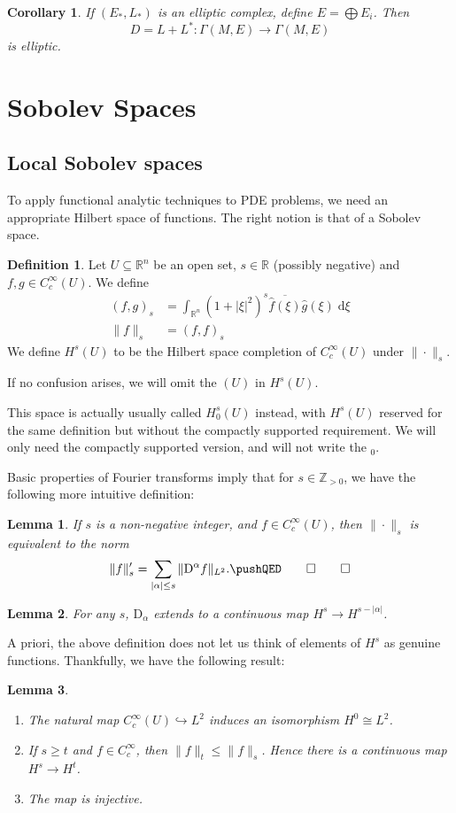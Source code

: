 \documentclass{shortart}
\newtheorem*{lemma}{Lemma}
\newtheorem*{cor}{Corollary}
\theoremstyle{definition}
\newtheorem*{defi}{Definition}
\newcommand\R{\mathbb{R}}
\newcommand\Z{\mathbb{Z}}
\renewcommand\d{\mathrm{d}}
\newcommand\D{\mathrm{D}}
\begin{document}
\begin{cor}
  If $(E_*, L_*)$ is an elliptic complex, define $E = \bigoplus E_i$. Then
  \[
    D = L + L^*: \Gamma(M, E) \to \Gamma(M, E)
  \]
  is elliptic.\fakeqed
\end{cor}

\section{Sobolev Spaces}
\subsection{Local Sobolev spaces}
To apply functional analytic techniques to PDE problems, we need an appropriate Hilbert space of functions. The right notion is that of a Sobolev space.
\begin{defi}
  Let $U \subseteq \R^n$ be an open set, $s \in \R$ (possibly negative) and $f, g \in C_c^\infty(U)$. We define
  \begin{align*}
    (f, g)_s &= \int_{\R^n} (1 + |\xi|^2)^s \overline{\hat{f}(\xi)}\hat{g}(\xi) \;\d \xi\\
    \|f\|_s &= (f, f)_s
  \end{align*}
  We define $H^s(U)$ to be the Hilbert space completion of $C_c^\infty(U)$ under $\|\cdot\|_s$.

  If no confusion arises, we will omit the $(U)$ in $H^s(U)$.
\end{defi}
This space is actually usually called $H_0^s(U)$ instead, with $H^s(U)$ reserved for the same definition but without the compactly supported requirement. We will only need the compactly supported version, and will not write the $_0$.

Basic properties of Fourier transforms imply that for $s \in \Z_{>0}$, we have the following more intuitive definition:
\begin{lemma}
  If $s$ is a non-negative integer, and $f \in C_c^\infty(U)$, then $\|\cdot\|_s$ is equivalent to the norm
  \[
    \|f\|_s' = \sum_{|\alpha| \leq s} \|\mathrm{D}^\alpha f\|_{L^2}.\fakeqed
  \]\ifplastex\fakeqed\fi
\end{lemma}
\begin{lemma}
  For any $s$, $\D_\alpha$ extends to a continuous map $H^s \to H^{s - |\alpha|}$.\fakeqed
\end{lemma}
A priori, the above definition does not let us think of elements of $H^s$ as genuine functions. Thankfully, we have the following result:
\begin{lemma}\leavevmode
  \begin{enumerate}
    \item The natural map $C_c^\infty(U) \hookrightarrow L^2$ induces an isomorphism $H^0 \cong L^2$.
    \item If $s \geq t$ and $f \in C_c^\infty$, then $\|f\|_t \leq \|f\|_s$. Hence there is a continuous map $H^s \to H^t$.
    \item The map is injective.
  \end{enumerate}
\end{lemma}
\end{document}
